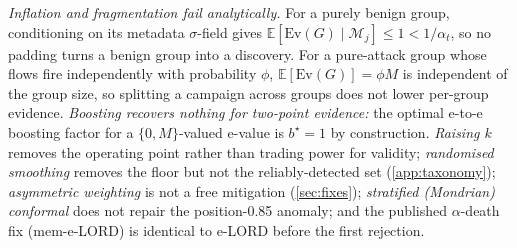 \documentclass[conference]{IEEEtran}
\newcommand{\ceil}{M}
\newcommand{\alphat}{\alpha_t}
\newcommand{\Ev}{\mathrm{Ev}}
\begin{document}
\emph{Inflation and fragmentation fail analytically.} For a purely benign group, conditioning on its
metadata $\sigma$-field gives $\mathbb E[\Ev(G)\mid\mathcal M_j]\le1<1/\alphat$, so no padding turns a
benign group into a discovery. For a pure-attack group whose flows fire independently with probability
$\phi$, $\mathbb E[\Ev(G)]=\phi\ceil$ is independent of the group size, so splitting a campaign across
groups does not lower per-group evidence. \emph{Boosting recovers nothing for two-point evidence:} the
optimal e-to-e boosting factor for a $\{0,\ceil\}$-valued e-value is $b^{\star}=1$ by construction.
\emph{Raising $k$} removes the operating point rather than trading power for validity; \emph{randomised
smoothing} removes the floor but not the reliably-detected set (\cref{app:taxonomy}); \emph{asymmetric
weighting} is not a free mitigation (\cref{sec:fixes}); \emph{stratified (Mondrian) conformal} does not
repair the position-0.85 anomaly; and the published $\alpha$-death fix (mem-e-LORD) is identical to e-LORD
before the first rejection.
\end{document}
